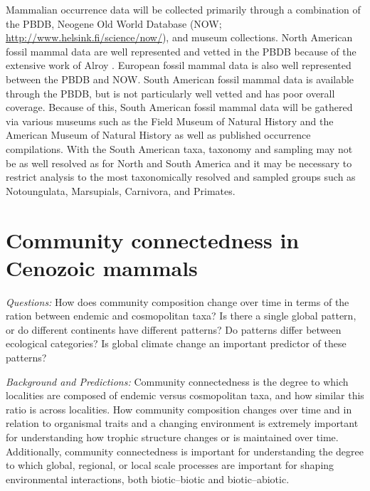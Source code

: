 \documentclass[12pt,letterpaper]{article}
\begin{document}
Mammalian occurrence data will be collected primarily through a combination of the PBDB, Neogene Old World Database (NOW; \url{http://www.helsink.fi/science/now/}), and museum collections. North American fossil mammal data are well represented and vetted in the PBDB because of the extensive work of Alroy \citep{Alroy1996a,Alroy1998,Alroy2000g}. European fossil mammal data is also well represented between the PBDB and NOW. South American fossil mammal data is available through the PBDB, but is not particularly well vetted and has poor overall coverage. Because of this, South American fossil mammal data will be gathered via various museums such as the Field Museum of Natural History and the American Museum of Natural History as well as published occurrence compilations. With the South American taxa, taxonomy and sampling may not be as well resolved as for North and South America and it may be necessary to restrict analysis to the most taxonomically resolved and sampled groups such as Notoungulata, Marsupials, Carnivora, and Primates.


\section{Community connectedness in Cenozoic mammals}

\textit{Questions:} 
How does community composition change over time in terms of the ration between endemic and cosmopolitan taxa? Is there a single global pattern, or do different continents have different patterns? Do patterns differ between ecological categories? Is global climate change an important predictor of these patterns?

\textit{Background and Predictions:}
Community connectedness is the degree to which localities are composed of endemic versus cosmopolitan taxa, and how similar this ratio is across localities. How community composition changes over time and in relation to organismal traits and a changing environment is extremely important for understanding how trophic structure changes or is maintained over time. Additionally, community connectedness is important for understanding the degree to which global, regional, or local scale processes are important for shaping environmental interactions, both biotic--biotic and biotic--abiotic.
\end{document}
